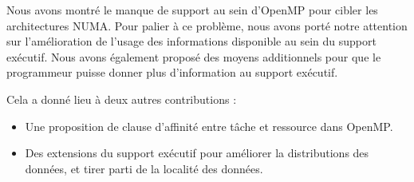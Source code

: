 Nous avons montré le manque de support au sein d'OpenMP pour cibler les architectures NUMA.
Pour palier à ce problème, nous avons porté notre attention sur l'amélioration de l'usage des informations disponible au sein du support exécutif. Nous avons également proposé des moyens additionnels pour que le programmeur puisse donner plus d'information au support exécutif.

Cela a donné lieu à deux autres contributions :
\begin{itemize}
 \item Une proposition de clause d'affinité entre tâche et ressource dans OpenMP.
 \item Des extensions du support exécutif pour améliorer la distributions des données, et tirer parti de la localité des données.
\end{itemize}



